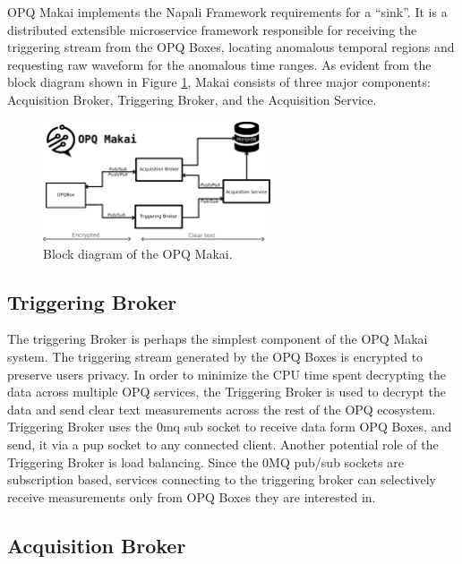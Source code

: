 OPQ Makai implements the Napali Framework requirements for a ``sink''.  It is a distributed extensible microservice framework responsible for receiving the triggering stream from the OPQ Boxes, locating anomalous temporal regions and requesting raw waveform for the anomalous time ranges. As evident from the block diagram shown in Figure \ref{fig:7}, Makai consists of three major components: Acquisition Broker, Triggering Broker, and the Acquisition Service. 
\begin{figure}[h]
  \begin{center}
  \includegraphics[width=0.6\textwidth]{img/makai_main.pdf}
  \end{center}
  \caption{Block diagram of the OPQ Makai.}
  \label{fig:7}
\end{figure}

\subsection{Triggering Broker}

The triggering Broker is perhaps the simplest component of the OPQ Makai system. The triggering stream generated by the OPQ Boxes is encrypted to preserve users privacy. In order to minimize the CPU time spent decrypting the data across multiple OPQ services, the Triggering Broker is used to decrypt the data and send clear text measurements across the rest of the OPQ ecosystem. Triggering Broker uses the 0mq sub socket to receive data form OPQ Boxes, and send, it via a pup socket to any connected client. Another potential role of the Triggering Broker is load balancing. Since the 0MQ pub/sub sockets are subscription based, services connecting to the triggering broker can selectively receive measurements only from OPQ Boxes they are interested in. 

\subsection{Acquisition Broker}

